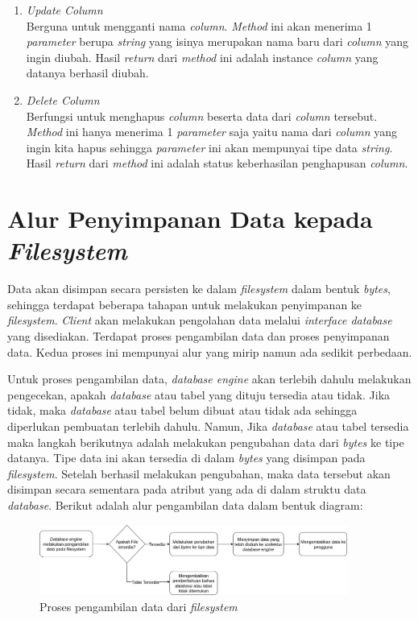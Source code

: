 \begin{enumerate}
  
	\item \emph{Update Column} \\
  Berguna untuk mengganti nama \emph{column}. \emph{Method} ini akan menerima 1 \emph{parameter} 
  berupa \emph{string} yang isinya merupakan nama baru dari \emph{column} yang ingin diubah. 
  Hasil \emph{return} dari \emph{method} ini adalah instance \emph{column} yang datanya berhasil diubah.
  
 
	\item \emph{Delete Column} \\
  Berfungsi untuk menghapus \emph{column} beserta data dari \emph{column} tersebut. \emph{Method} 
  ini hanya menerima 1 \emph{parameter} saja yaitu nama dari \emph{column} yang ingin kita 
  hapus sehingga \emph{parameter} ini akan mempunyai tipe data \emph{string}. Hasil \emph{return} 
  dari \emph{method} ini adalah status keberhasilan penghapusan \emph{column}.  
 
\end{enumerate}


\section{Alur Penyimpanan Data kepada \emph{Filesystem}}

Data akan disimpan secara persisten ke dalam \emph{filesystem} dalam bentuk \emph{bytes}, sehingga terdapat 
beberapa tahapan untuk melakukan penyimpanan ke \emph{filesystem}. \emph{Client} akan melakukan pengolahan 
data melalui \emph{interface database} yang disediakan. Terdapat proses pengambilan data dan proses penyimpanan 
data. Kedua proses ini mempunyai alur yang mirip namun ada sedikit perbedaan. 

Untuk proses pengambilan data, \emph{database engine} akan terlebih dahulu melakukan pengecekan, apakah 
\emph{database} atau tabel yang dituju tersedia atau tidak. Jika tidak, maka \emph{database} atau tabel
belum dibuat atau tidak ada sehingga diperlukan pembuatan terlebih dahulu. Namun, Jika \emph{database} atau tabel 
tersedia maka langkah berikutnya adalah melakukan pengubahan data dari \emph{bytes} ke tipe datanya.
Tipe data ini akan tersedia di dalam \emph{bytes} yang disimpan pada \emph{filesystem}.  Setelah berhasil melakukan pengubahan,
maka data tersebut akan disimpan secara sementara pada atribut yang ada di dalam struktu data \emph{database}.
Berikut adalah alur pengambilan data dalam bentuk diagram:

\begin{figure}[H]
  \centering{}
	\includegraphics[width=0.9\textwidth]{gambar/bab3/proses-pengambilan-data-filesystem}
  \caption{Proses pengambilan data dari \emph{filesystem}}
\end{figure}

